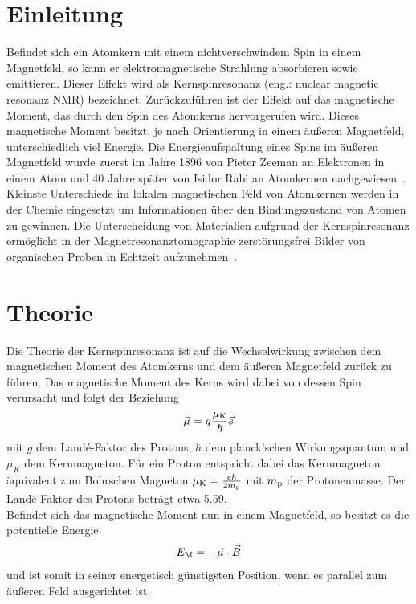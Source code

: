 \documentclass[paper=a4,
	fontsize=10pt,
	DIV=18,
	twocolumn,
	parskip=half
	]{scrartcl}
\numberwithin{equation}{section}    %
\begin{document}
\section{Einleitung}
\label{Einleitung}
%
Befindet sich ein Atomkern mit einem nichtverschwindem Spin in einem Magnetfeld, so kann er elektromagnetische Strahlung absorbieren sowie emittieren. Dieser Effekt wird als Kernspinresonanz (eng.: nuclear magnetic resonanz NMR) bezeichnet.
Zurückzuführen ist der Effekt auf das magnetische Moment, das durch den Spin des Atomkerns hervorgerufen wird. Dieses magnetische Moment besitzt, je nach Orientierung in einem äußeren Magnetfeld, unterschiedlich viel Energie. 
Die Energieaufspaltung eines Spins im äußeren Magnetfeld wurde zuerst im Jahre 1896 von Pieter Zeeman an Elektronen in einem Atom und 40 Jahre später von Isidor Rabi an Atomkernen nachgewiesen~\citep{rabi}.\\
Kleinste Unterschiede im lokalen magnetischen Feld von Atomkernen werden in der Chemie eingesetzt um Informationen über den Bindungszustand von Atomen zu gewinnen. Die Unterscheidung von Materialien aufgrund der Kernspinresonanz ermöglicht in der Magnetresonanztomographie zerstörungsfrei Bilder von organischen Proben in Echtzeit aufzunehmen~\citep{nmr}.


%
\section{Theorie}
\label{Theorie}
%
\label{theorie}
Die Theorie der Kernspinresonanz ist auf die Wechselwirkung zwischen dem magnetischen Moment des Atomkerns und dem äußeren Magnetfeld zurück zu führen.
Das magnetische Moment des Kerns wird dabei von dessen Spin verursacht und folgt der Beziehung
\begin{align}
\vec{\mu}=g \frac{\mu_{\rm K}}{\hbar}\vec{s}
\end{align}
mit $g$ dem Landé-Faktor des Protons, $\hbar$ dem planck'schen Wirkungsquantum und $\mu_K$ dem Kernmagneton. Für ein Proton entspricht dabei das Kernmagneton äquivalent zum Bohrschen Magneton $\mu_{\rm K}=\frac{e \hbar}{2m_{\rm p}}$ mit $m_{\rm p}$ der Protonenmasse. Der Landé-Faktor des Protons beträgt etwa 5.59.\\
Befindet sich das magnetische Moment nun in einem Magnetfeld, so besitzt es die potentielle Energie 
\begin{align}
E_{\rm M}=-\vec{\mu} \cdot \vec{B}
\end{align}
und ist somit in seiner energetisch günstigsten Position, wenn es parallel zum äußeren Feld ausgerichtet ist.
\end{document}
